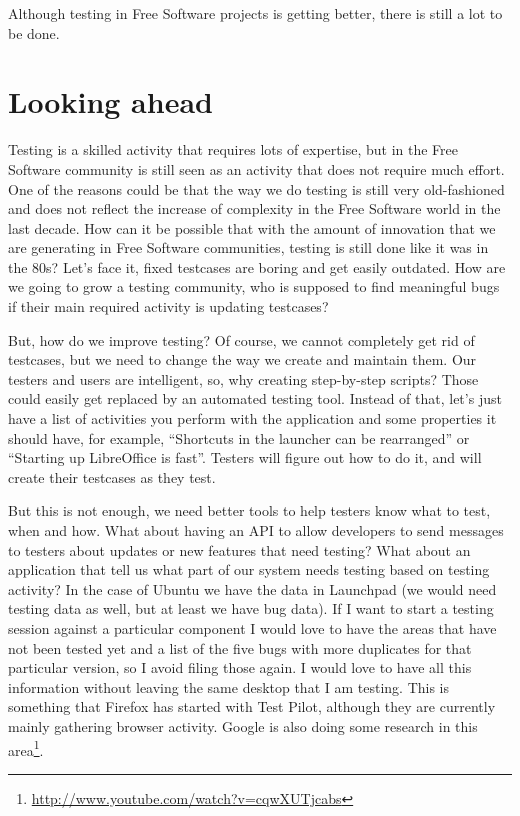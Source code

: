 Although testing in Free Software projects is getting better, there is still a lot to be
done.

\section*{Looking ahead}

Testing is a skilled activity that requires lots of expertise, but in the Free Software
community is still seen as an activity that does not require much effort. One of
the reasons could be that the way we do testing is still very old-fashioned and
does not reflect the increase of complexity in the Free Software world in the
last decade. How can it be possible that with the amount of innovation that we
are generating in Free Software communities, testing is still done like it was in
the 80s? Let's face it, fixed testcases are boring and get easily outdated. How
are we going to grow a testing community, who is supposed to find meaningful
bugs if their main required activity is updating testcases?

But, how do we improve testing? Of course, we cannot completely get rid of
testcases, but we need to change the way we create and maintain them. Our
testers and users are intelligent, so, why creating step-by-step scripts? Those
could easily get replaced by an automated testing tool. Instead of that, let's
just have a list of activities you perform with the application and some
properties it should have, for example, ``Shortcuts in the launcher can be
rearranged'' or ``Starting up LibreOffice is fast''. Testers will figure out how
to do it, and will create their testcases as they test.

But this is not enough, we need better tools to help testers know what to test,
when and how.  What about having an API to allow developers to send messages to
testers about updates or new features that need testing? What about an
application that tell us what part of our system needs testing based on testing
activity? In the case of Ubuntu we have the data in Launchpad (we would need
testing data as well, but at least we have bug data). If I want to start a
testing session against a particular component I would love to have the areas
that have not been tested yet and a list of the five bugs with more duplicates
for that particular version, so I avoid filing those again. I would love to have
all this information without leaving the same desktop that I am testing. This is
something that Firefox has started with Test Pilot, although they are currently
mainly gathering browser activity. Google is also doing some research in this
area\footnote{\url{http://www.youtube.com/watch?v=cqwXUTjcabs}}.

